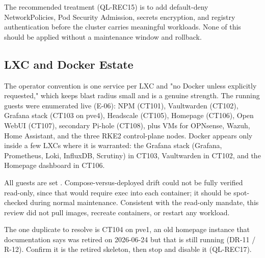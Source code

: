 The recommended treatment (QL-REC15) is to add default-deny NetworkPolicies, Pod
Security Admission, secrets encryption, and registry authentication before the cluster
carries meaningful workloads. None of this should be applied without a maintenance window
and rollback.

\subsection{LXC and Docker Estate}

The operator convention is one service per LXC and "no Docker unless explicitly
requested," which keeps blast radius small and is a genuine strength. The running guests
were enumerated live (E-06): NPM (CT101), Vaultwarden (CT102), Grafana stack (CT103 on
pve4), Headscale (CT105), Homepage (CT106), Open WebUI (CT107), secondary Pi-hole
(CT108), plus VMs for OPNsense, Wazuh, Home Assistant, and the three RKE2 control-plane
nodes. Docker appears only inside a few LXCs where it is warranted: the Grafana stack
(Grafana, Prometheus, Loki, InfluxDB, Scrutiny) in CT103, Vaultwarden in CT102, and the
Homepage dashboard in CT106.

All guests are set . Compose-versus-deployed drift could not be fully
verified read-only, since that would require exec into each container; it should be
spot-checked during normal maintenance. Consistent with the read-only mandate, this
review did not pull images, recreate containers, or restart any workload.

\begin{callout}
The one duplicate to resolve is CT104 on pve1, an old homepage instance that
documentation says was retired on 2026-06-24 but that is still running (DR-11 / R-12).
Confirm it is the retired skeleton, then stop and disable it (QL-REC17).
\end{callout}
